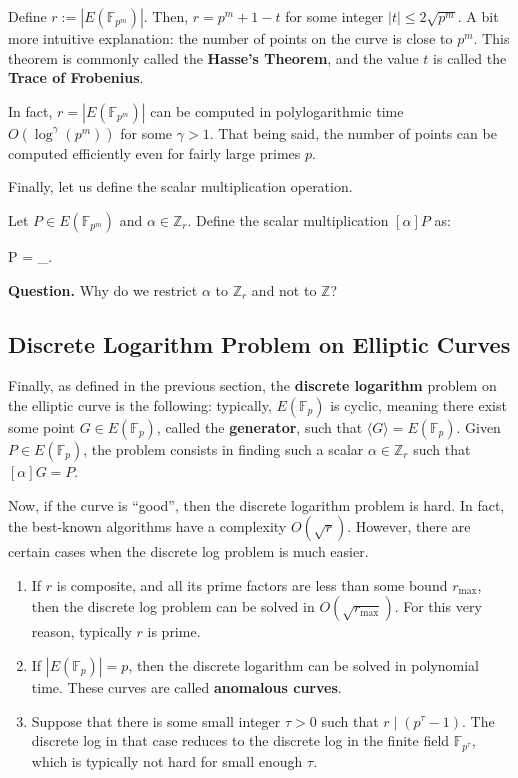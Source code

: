 \documentclass[../lecture-notes-148x210.tex]{subfiles}
\begin{document}
\begin{theorem}
    Define $r := |E(\mathbb{F}_{p^m})|$. Then, $r = p^m + 1 - t$ for some
    integer $|t| \leq 2\sqrt{p^m}$. A bit more intuitive explanation: the number
    of points on the curve is close to $p^m$. This theorem is commonly called
    the \textbf{Hasse's Theorem}, and the value $t$ is called
    the \textbf{Trace of Frobenius}.
\end{theorem}

\begin{remark}
    In fact, $r=|E(\mathbb{F}_{p^m})|$ can be computed in polylogarithmic time
    $O(\log^{\gamma}(p^m))$ for some $\gamma>1$. That being said, the number of
    points can be computed efficiently even for fairly large primes $p$.
\end{remark}

Finally, let us define the scalar multiplication operation. 

\begin{definition}
    Let $P \in E(\mathbb{F}_{p^m})$ and $\alpha \in \mathbb{Z}_r$. Define the scalar multiplication $[\alpha]P$ as:
    \begin{xequation}
        [\alpha]P = _{\alpha {}}.
    \end{xequation}
\end{definition}

\textbf{Question.} Why do we restrict $\alpha$ to $\mathbb{Z}_r$ and not to $\mathbb{Z}$?

\subsection{Discrete Logarithm Problem on Elliptic Curves}
Finally, as defined in the previous section, the \textbf{discrete logarithm}
problem on the elliptic curve is the following: typically, $E(\mathbb{F}_p)$ is
cyclic, meaning there exist some point $G \in E(\mathbb{F}_p)$, called the
\textbf{generator}, such that $\langle G \rangle = E(\mathbb{F}_p)$. Given $P
\in E(\mathbb{F}_p)$, the problem consists in finding such a scalar $\alpha \in
\mathbb{Z}_r$ such that $[\alpha]G = P$. 

Now, if the curve is ``good'', then the discrete logarithm problem is hard. In fact, the best-known algorithms have a complexity $O(\sqrt{r})$. However, there are certain cases when the discrete log problem is much easier.
\begin{enumerate}
    \item If $r$ is composite, and all its prime factors are less than some bound $r_{\max}$, then the discrete log problem can be solved in $O(\sqrt{r_{\max}})$. For this very reason, typically $r$ is prime.
    \item If $|E(\mathbb{F}_p)|=p$, then the discrete logarithm can be solved in polynomial time. These curves are called \textbf{anomalous curves}.
    \item Suppose that there is some small integer $\tau>0$ such that $r \mid (p^{\tau}-1)$. The discrete log in that case reduces to the discrete log in the finite field $\mathbb{F}_{p^{\tau}}$, which is typically not hard for small enough $\tau$.
\end{enumerate}
\end{document}
